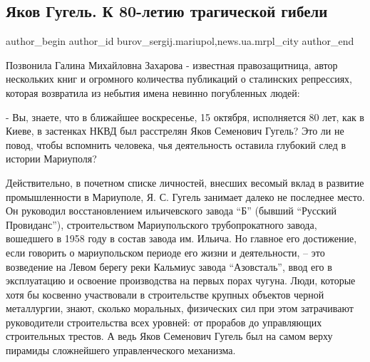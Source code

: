  
 
 
 
 
 
\subsection{Яков Гугель. К 80-летию трагической гибели}
\label{sec:14_10_2017.stz.news.ua.mrpl_city.1.jakov_gugel_k_80_letiju_tragicheskoj_gibeli}
 
\ifcmt
 author_begin
   author_id burov_sergij.mariupol,news.ua.mrpl_city
 author_end
\fi


Позвонила Галина Михайловна Захарова - известная правозащитница, автор
нескольких книг и огромного количества публикаций о сталинских репрессиях,
которая возвратила из небытия имена невинно погубленных людей:

- Вы, знаете, что в ближайшее воскресенье, 15 октября, исполняется 80 лет, как
в Киеве, в застенках НКВД был расстрелян Яков Семенович Гугель? Это ли не
повод, чтобы вспомнить человека, чья деятельность оставила глубокий след в
истории Мариуполя?

Действительно, в почетном списке личностей, внесших весомый вклад в развитие
промышленности в Мариуполе, Я. С. Гугель занимает далеко не последнее место. Он
руководил восстановлением ильичевского завода \enquote{Б} (бывший \enquote{Русский Провиданс}),
строительством Мариупольского трубопрокатного завода, вошедшего в 1958 году в
состав  завода им. Ильича. Но главное его достижение, если говорить о
мариупольском периоде его жизни и деятельности, – это возведение на Левом
берегу реки Кальмиус завода \enquote{Азовсталь}, ввод его в эксплуатацию и освоение
производства на первых порах чугуна. Люди, которые хотя бы косвенно участвовали
в строительстве крупных объектов черной металлургии, знают, сколько моральных,
физических сил при этом затрачивают руководители строительства всех уровней: от
прорабов до управляющих строительных трестов. А ведь Яков Семенович Гугель был
на самом верху пирамиды сложнейшего управленческого механизма.

